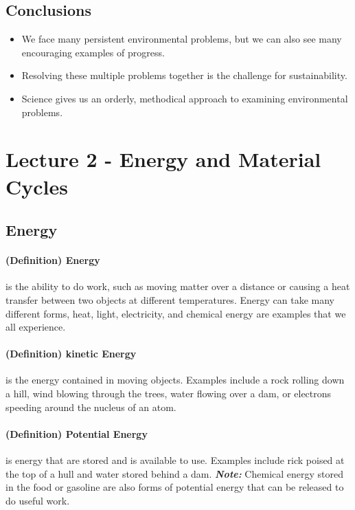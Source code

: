 \documentclass[10pt]{article}
\begin{document}
\subsection{Conclusions}
\begin{itemize}
    \item We face many persistent environmental problems, but we can also see many encouraging examples of progress.
    \item \color{Red} Resolving these multiple problems together is the challenge for sustainability.\color{Black}
    \item Science gives us an orderly, methodical approach to examining environmental problems. 
\end{itemize}


\section{Lecture 2 - Energy and Material Cycles}
\subsection{Energy}
\paragraph{(Definition) Energy} is the ability to do work, such as moving matter over a distance or causing a heat transfer between two objects at different temperatures. Energy can take many different forms, heat, light, electricity, and chemical energy are examples that we all experience. 

\paragraph{(Definition) kinetic Energy} is the energy contained in moving objects. Examples include a rock rolling down a hill, wind blowing through the trees, water flowing over a dam, or electrons speeding around the nucleus of an atom. 

\paragraph{(Definition) Potential Energy} is energy that are stored and is available to use. Examples include rick poised at the top of a hull and water stored behind a dam. \textbf{\textit{Note:}} Chemical energy stored in the food or gasoline are also forms of potential energy that can be released to do useful work. 
\end{document}
